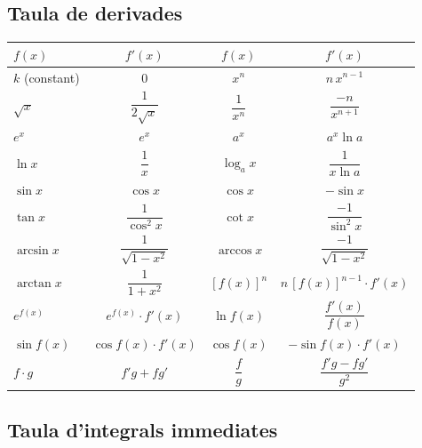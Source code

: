 \subsection*{Taula de derivades}

\begin{table}[H]
\centering
\renewcommand{\arraystretch}{1.25}
\begin{tabular}{lccc}
\toprule
$f(x)$ & $f'(x)$ & $f(x)$ & $f'(x)$ \\
\midrule
$k$ (constant) & $0$ & $x^n$ & $n\,x^{n-1}$ \\
$\sqrt{x}$ & $\dfrac{1}{2\sqrt{x}}$ & $\dfrac{1}{x^n}$ & $\dfrac{-n}{x^{n+1}}$ \\
$e^x$ & $e^x$ & $a^x$ & $a^x\ln a$ \\
$\ln x$ & $\dfrac{1}{x}$ & $\log_a x$ & $\dfrac{1}{x\ln a}$ \\
$\sin x$ & $\cos x$ & $\cos x$ & $-\sin x$ \\
$\tan x$ & $\dfrac{1}{\cos^2 x}$ & $\cot x$ & $\dfrac{-1}{\sin^2 x}$ \\
$\arcsin x$ & $\dfrac{1}{\sqrt{1-x^2}}$ & $\arccos x$ & $\dfrac{-1}{\sqrt{1-x^2}}$ \\
$\arctan x$ & $\dfrac{1}{1+x^2}$ & $[f(x)]^n$ & $n\,[f(x)]^{n-1}\cdot f'(x)$ \\
$e^{f(x)}$ & $e^{f(x)}\cdot f'(x)$ & $\ln f(x)$ & $\dfrac{f'(x)}{f(x)}$ \\
$\sin f(x)$ & $\cos f(x)\cdot f'(x)$ & $\cos f(x)$ & $-\sin f(x)\cdot f'(x)$ \\
$f\cdot g$ & $f'g + fg'$ & $\dfrac{f}{g}$ & $\dfrac{f'g - fg'}{g^2}$ \\
\bottomrule
\end{tabular}
\end{table}

\subsection*{Taula d'integrals immediates}

